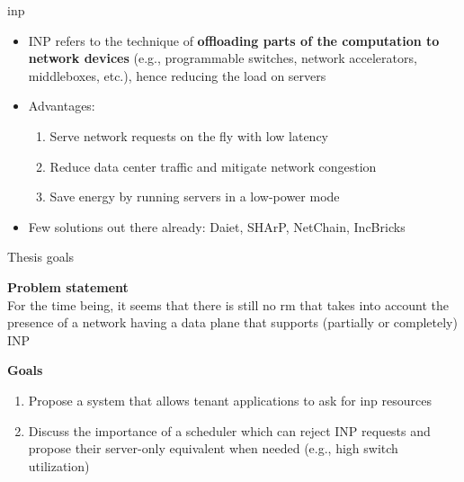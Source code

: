 \begin{frame}[fragile]{\gls*{inp}}

    \setcounter{footnote}{0}

    \begin{itemize}
        \item INP refers to the technique of \textbf{offloading parts of the computation to network devices} (e.g., programmable switches, network accelerators, middleboxes, etc.), hence reducing the load on servers
        \item Advantages:
        \begin{enumerate} %
            \item Serve network requests on the fly with low latency
            \item Reduce data center traffic and mitigate network congestion
            \item Save energy by running servers in a low-power mode
        \end{enumerate}
        \item Few solutions out there already: Daiet\footnotemark{}, SHArP\footnotemark{}, NetChain\footnotemark{}, IncBricks\footnotemark{}
    \end{itemize}

    \setcounter{footnote}{1}
\end{frame}

\begin{frame}[fragile]{Thesis goals}
    
    \textbf{Problem statement}\\
    For the time being, it seems that there is still no \gls*{rm} that takes into account the presence of a network having a data plane that supports (partially or completely) INP

    \vspace{5mm}

    \textbf{Goals}\\
    \begin{enumerate}
        \item Propose a system that allows tenant applications to ask for \gls*{inp} resources
        \item Discuss the importance of a scheduler which can reject INP requests and propose their server-only equivalent when needed (e.g., high switch utilization)
    \end{enumerate}

\end{frame}
